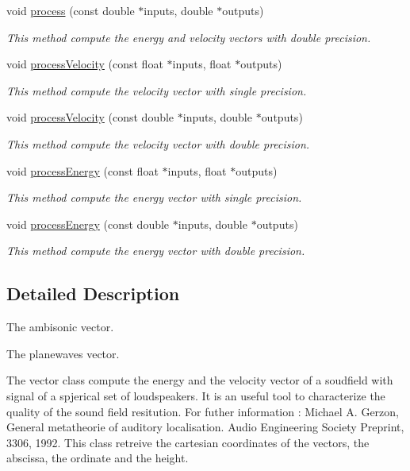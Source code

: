 \begin{DoxyCompactItemize}
void \hyperlink{class_hoa3_d_1_1_vector_abf7d541dea71e683dda0aa494d843a64}{process} (const double $\ast$inputs, double $\ast$outputs)
\begin{DoxyCompactList}\small\item\em This method compute the energy and velocity vectors with double precision. \end{DoxyCompactList}\item 
void \hyperlink{class_hoa3_d_1_1_vector_a9c875cc6ac2171c5d8e1b8c1d466a844}{process\-Velocity} (const float $\ast$inputs, float $\ast$outputs)
\begin{DoxyCompactList}\small\item\em This method compute the velocity vector with single precision. \end{DoxyCompactList}\item 
void \hyperlink{class_hoa3_d_1_1_vector_a34ae72be81e72815e057e716a0f24d36}{process\-Velocity} (const double $\ast$inputs, double $\ast$outputs)
\begin{DoxyCompactList}\small\item\em This method compute the velocity vector with double precision. \end{DoxyCompactList}\item 
void \hyperlink{class_hoa3_d_1_1_vector_a7abd76a93ade46d069c922064f14c1b7}{process\-Energy} (const float $\ast$inputs, float $\ast$outputs)
\begin{DoxyCompactList}\small\item\em This method compute the energy vector with single precision. \end{DoxyCompactList}\item 
void \hyperlink{class_hoa3_d_1_1_vector_a28ad63d95b4d2c1ccabdada1955f5f96}{process\-Energy} (const double $\ast$inputs, double $\ast$outputs)
\begin{DoxyCompactList}\small\item\em This method compute the energy vector with double precision. \end{DoxyCompactList}\end{DoxyCompactItemize}


\subsection{Detailed Description}
The ambisonic vector. 

The planewaves vector.

The vector class compute the energy and the velocity vector of a soudfield with signal of a spjerical set of loudspeakers. It is an useful tool to characterize the quality of the sound field resitution. For futher information \-: Michael A. Gerzon, General metatheorie of auditory localisation. Audio Engineering Society Preprint, 3306, 1992. This class retreive the cartesian coordinates of the vectors, the abscissa, the ordinate and the height. 

